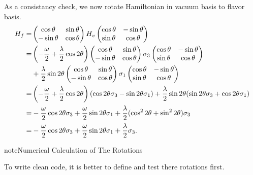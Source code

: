 \documentclass[letterpaper,12pt,english]{sphinxmanual}
\begin{document}
As a consistancy check, we now rotate Hamiltonian in vacuum basis to flavor basis.
\begin{gather}
\begin{split}H_f =& \begin{pmatrix} \cos \theta & \sin \theta \\ -\sin \theta & \cos\theta \end{pmatrix} H_v \begin{pmatrix} \cos \theta & -\sin \theta \\ \sin \theta & \cos\theta \end{pmatrix}\\
=& \left(-\frac{\omega}{2} + \frac{\lambda}{2} \cos 2\theta \right) \begin{pmatrix} \cos \theta & \sin \theta \\ -\sin \theta & \cos\theta \end{pmatrix} \sigma_3 \begin{pmatrix} \cos \theta & -\sin \theta \\ \sin \theta & \cos\theta \end{pmatrix} \\
&+ \frac{\lambda}{2} \sin 2\theta \begin{pmatrix} \cos \theta & \sin \theta \\ -\sin \theta & \cos\theta \end{pmatrix} \sigma_1 \begin{pmatrix} \cos \theta & -\sin \theta \\ \sin \theta & \cos\theta \end{pmatrix} \\
=& \left(-\frac{\omega}{2} + \frac{\lambda}{2} \cos 2\theta \right) ( \cos 2\theta \sigma_3 - \sin 2\theta \sigma_1 ) + \frac{\lambda}{2}\sin 2\theta ( \sin 2\theta \sigma_3 + \cos 2\theta \sigma_1 ) \\
=& -\frac{\omega}{2} \cos 2\theta \sigma_3 + \frac{\omega}{2}\sin 2\theta \sigma_1 + \frac{\lambda}{2} ( \cos^2 2\theta + \sin ^2 2\theta ) \sigma_3 \\
=& -\frac{\omega}{2} \cos 2\theta \sigma_3 + \frac{\omega}{2}\sin 2\theta \sigma_1 + \frac{\lambda}{2}\sigma_3 .\end{split}\notag
\end{gather}
\begin{notice}{note}{Numerical Calculation of The Rotations}

To write clean code, it is better to define and test there rotations first.
\end{notice}
\end{document}
